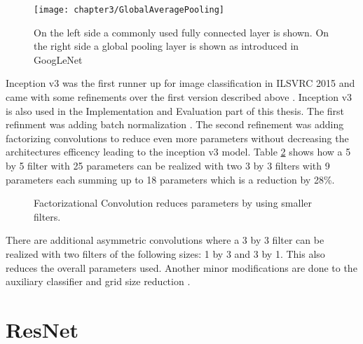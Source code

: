 \begin{figure}[H]
  \centering
  \caption{On the left side a commonly used fully connected layer is shown. On the right side a global pooling layer is shown as introduced in GoogLeNet \cite{ReviewGoogleLeNetv1}}
  \texttt{[image: chapter3/GlobalAveragePooling]}
  \label{fig:GlobalAveragePooling}
\end{figure}

Inception v3 was the first runner up for image classification in ILSVRC 2015 and came with some refinements over the first version described above \cite{szegedy2016rethinking}. Inception v3 is also used in the Implementation and Evaluation part of this thesis. The first refinment was adding batch normalization \cite{ioffe2015batch}. The second refinement was adding factorizing convolutions to reduce even more parameters without decreasing the architectures efficency leading to the inception v3 model. Table \ref{fig:factorization} shows how a 5 by 5 filter with 25 parameters can be realized with two 3 by 3 filters with 9 parameters each summing up to 18 parameters which is a reduction by 28\%.

\begin{figure}[H]
\centering
\caption{Factorizational Convolution reduces parameters by using smaller filters.}
\label{fig:factorization}
\end{figure}

There are additional asymmetric convolutions where a 3 by 3 filter can be realized with two filters of the following sizes: 1 by 3 and 3 by 1. This also reduces the overall parameters used. Another minor modifications are done to the auxiliary classifier and grid size reduction \cite{szegedy2016rethinking}.

\section{ResNet}

